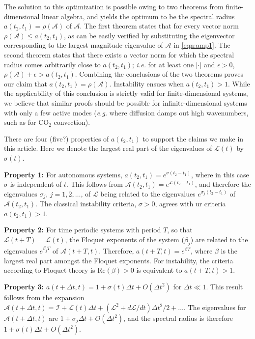 \documentclass[letterpaper,10pt,prl,twocolumn,aps,reprint,superscriptaddress]{revtex4-1}
\newcommand{\cotwo}{CO$_2$ }
\newcommand{\cL}{\boldsymbol{\mathcal{L}}}
\newcommand{\cA}{\boldsymbol{\mathcal{A}}}
\newcommand{\cI}{\boldsymbol{\mathcal{I}}}
\newcommand{\nrm}{{|\cdot|}}
\begin{document}
The solution to this optimization is possible owing to two theorems from finite-dimensional linear algebra, and yields the optimum to be the spectral radius $a(t_2,t_1) = \rho(\cA)$ of $\cA$. 
The first theorem states that for every vector norm $\rho(\cA) \le a(t_2,t_1)$, as can be easily verified by substituting the eigenvector corresponding to the largest magnitude eigenvalue of $\cA$ in \eqref{eqn:amp1}. 
The second theorem states that there exists a vector norm for which the spectral radius comes arbitrarily close to $a(t_2,t_1)$\cite{bulirsch2002introduction}; {\it i.e.} for at least one $\nrm$ and $\epsilon>0$, $\rho (\cA) + \epsilon > a(t_2,t_1)$. 
Combining the conclusions of the two theorems proves our claim that $a(t_2, t_1) = \rho(\cA)$. 
Instability ensues when $a(t_2, t_1) > 1$.
While the applicability of this conclusion is strictly valid for finite-dimensional systems, we believe that similar proofs should be possible for infinite-dimensional systems with only a few active modes ({\it e.g.} where diffusion damps out high wavenumbers, such as for \cotwo convection).

There are four (five?) properties of $a(t_2, t_1)$ to support the claims we make in this article. 
Here we denote the largest real part of the eigenvalues of $\cL(t)$ by $\sigma(t)$.

{\bf Property 1:} 
For autonomous systems, $a(t_2, t_1) = e^{\sigma (t_2-t_1)}$, where in this case $\sigma$ is independent of $t$.
This follows from $\cA(t_2, t_1) = e^{\cL(t_2-t_1)}$, and therefore the eigenvalues $\sigma_j$, $j=1, 2, \dots$, of $\cL$ being related to the eigenvalues $e^{\sigma_j (t_2-t_1)}$ of $\cA(t_2,t_1)$.
The classical instability criteria, $\sigma > 0$, agrees with ur criteria $a(t_2, t_1)> 1$.

{\bf Property 2:}
For time periodic systems with period $T$, so that $\cL(t+T) = \cL(t)$, the Floquet exponents of the system ($\beta_j$) are related to the eigenvalues $e^{\beta_j T}$ of $\cA(t+T, t)$. 
Therefore, $a(t+T, t) = e^{\beta T}$, where $\beta$ is the largest real part amongst the Floquet exponents. 
For instability, the criteria according to Floquet theory is $\text{Re}(\beta) > 0$ is equivalent to $a(t+T, t) > 1$.

{\bf Property 3:}
$a(t+\Delta t, t) = 1 + \sigma(t) \Delta t + O(\Delta t^2)$ for $\Delta t \ll 1$. 
This result follows from the expansion $\cA(t+\Delta t, t) = \cI + \cL(t) \Delta t + (\cL^2 + d\cL/dt)\Delta t^2/2 + \dots$.
The eigenvalues for $\cA(t+\Delta t, t)$ are $1 + \sigma_j \Delta t + O(\Delta t^2)$, and the spectral radius is therefore $1 + \sigma(t) \Delta t + O(\Delta t^2).$
\end{document}
